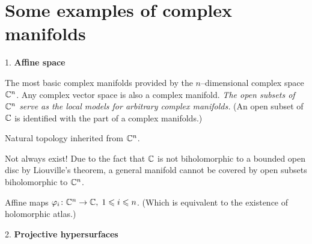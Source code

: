 \section{Some examples of complex manifolds}
1. \textbf{Affine space}

The most basic complex manifolds provided by the $n$--dimensional complex space ${\mathbb C}^n$. Any complex vector space is also a complex manifold. \textit{The open subsets of ${\mathbb C}^n$ serve as the local models for arbitrary complex manifolds.} (An open subset of ${\mathbb C}$ is identified with the part of a complex manifolds.)
\begin{description}[font=\upshape]
  \item[Topology] Natural topology inherited from ${\mathbb C}^n$. 
  \item[Open Covering] Not always exist! Due to the fact that ${\mathbb C}$ is not biholomorphic to a bounded open disc by Liouville's theorem, a general manifold cannot be covered by open subsets biholomorphic to ${\mathbb C}^n$.
  \item[Isomorphic Transition Maps] Affine maps $\varphi_i\colon {\mathbb C}^n \to {\mathbb C}, \; 1\leqslant  i\leqslant n$.  (Which is equivalent to the existence of holomorphic atlas.)
\end{description}


2. \textbf{Projective hypersurfaces}


